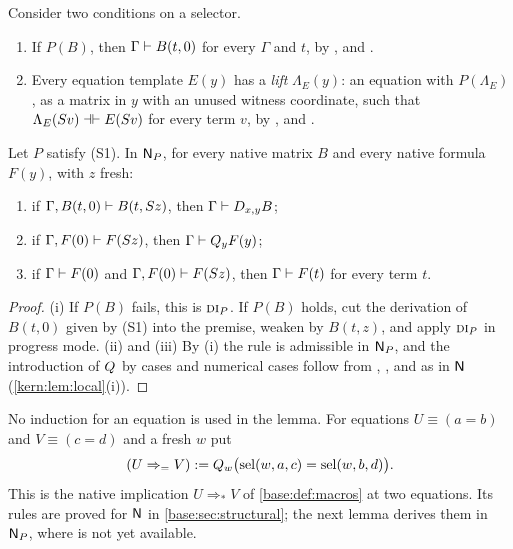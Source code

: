 Consider two conditions on a selector.
\begin{enumerate}[label=\textup{(S\arabic*)}]
\item If $P(B)$, then $\Gamma\vdash B(t,0)$ for every $\Gamma$ and $t$, by
 ,  and .
\item Every equation template $E(y)$ has a \emph{lift} $\Lambda_E(y)$: an
 equation with $P(\Lambda_E)$, as a matrix in $y$ with an unused witness
 coordinate, such that $\Lambda_E(S v)\dashv\vdash E(S v)$ for every
 term $v$, by ,  and .
\end{enumerate}

\begin{lemma}
\label{guard:lem:np-cases}
Let $P$ satisfy \textup{(S1)}.  In $\mathsf{N}_P$, for every native matrix $B$ and
every native formula $F(y)$, with $z$ fresh:
\begin{enumerate}[label=\textup{(\roman*)}]
\item if $\Gamma,B(t,0)\vdash B(t,S z)$, then
 $\Gamma\vdash D_{x,y}B$;
\item if $\Gamma,F(0)\vdash F(S z)$, then $\Gamma\vdash Q_{y}F(y)$;
\item if $\Gamma\vdash F(0)$ and $\Gamma,F(0)\vdash F(S z)$, then
 $\Gamma\vdash F(t)$ for every term $t$.
\end{enumerate}
\end{lemma}

\begin{proof}
(i) If $P(B)$ fails, this is $\rulename{DI}_P$.  If $P(B)$ holds, cut the
derivation of $B(t,0)$ given by (S1) into the premise, weaken by $B(t,z)$,
and apply $\rulename{DI}_P$ in progress mode.  (ii) and (iii) By (i) the
rule  is admissible in $\mathsf{N}_P$, and the introduction of
$Q_{}$ by cases and numerical cases follow from , ,
 and  as in $\mathsf{N}$ (\cref{kern:lem:local}(i)).
\end{proof}

No induction for an equation is used in the lemma.  For equations
$U\equiv(a=b)$ and $V\equiv(c=d)$ and a fresh $w$ put
\[
 (U\Rightarrow_{=}V)\mathrel{:=}Q_{w}\bigl(\operatorname{sel}(w,a,c)=\operatorname{sel}(w,b,d)\bigr).
\]
This is the native implication $U\Rightarrow_*V$ of \cref{base:def:macros}
at two equations.  Its rules are proved for $\mathsf{N}$ in
\cref{base:sec:structural}; the next lemma derives them in $\mathsf{N}_P$, where
 is not yet available.


